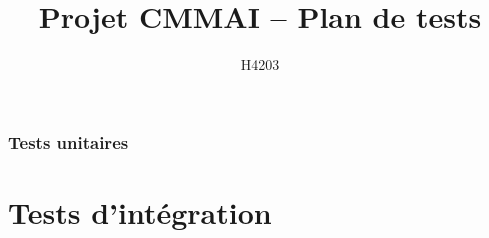 \documentclass[11pt, a4paper]{article}
\title{Projet CMMAI -- Plan de tests}
\author{H4203}
\date{}
\begin{document}
\maketitle
\tableofcontents

\section{Tests unitaires}




\newpage
\part{Tests d'intégration}
\setcounter{testno}{0}





\end{document}
